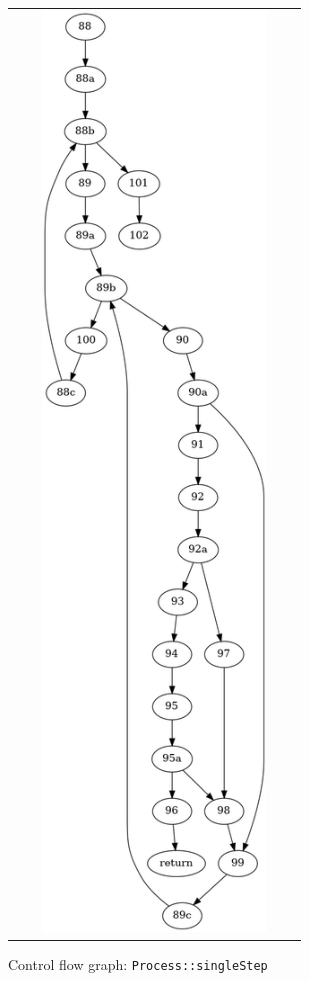 \documentclass[12pts]{report}
\begin{document}
\begin{figure}
\begin{tabular}{c @{} c @{} c}
\begin{minipage}{0.3\textwidth}
\begin{center}
\end{center}
\end{minipage}
&
\begin{minipage}{0.3\textwidth}
\begin{center}
\includegraphics[width=0.9\textwidth]{images/singleStep-cfg3.png}
\end{center}
\end{minipage}

\end{tabular}
\caption{Control flow graph: \lstinline[style=jc]|Process::singleStep|}
\label{f:fcg}
\end{figure}
\end{document}
